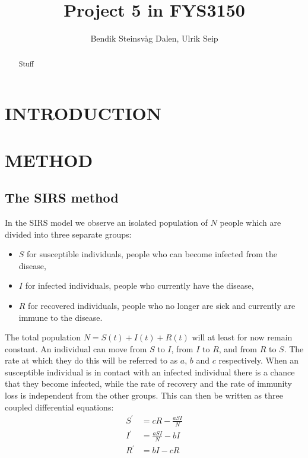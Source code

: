 \documentclass[a4paper]{article}
\title{Project 5 in FYS3150}
\author{Bendik Steinsvåg Dalen, Ulrik Seip}
\let\Oldsection\section
\renewcommand{\section}{\FloatBarrier\Oldsection}
\let\Oldsubsection\subsection
\renewcommand{\subsection}{\FloatBarrier\Oldsubsection}
\begin{document}
\maketitle


\begin{abstract}
	Stuff
\end{abstract}


\section{INTRODUCTION}


\section{METHOD}

\subsection{The SIRS method}

In the SIRS model we observe an isolated population of $N$ people which are divided into three separate groups:

\begin{itemize}
	\item $S$ for susceptible individuals, people who can become infected from the disease,
	\item $I$ for infected individuals, people who currently have the disease,
	\item $R$ for recovered individuals, people who no longer are sick and currently are immune to the disease.
\end{itemize}
The total population $N = S(t) + I(t) + R(t)$ will at least for now remain constant. An individual can move from $S$ to $I$, from $I$ to $R$, and from $R$ to $S$. The rate at which they do this will be referred to as $a$, $b$ and $c$ respectively. When an susceptible individual is in contact with an infected individual there is a chance that they become infected, while the rate of recovery and the rate of immunity loss is independent from the other groups. This can then be written as three coupled differential equations:
\begin{align}
S ^ { \prime } & = c R - \frac { a S I } { N } \\
I ^ { \prime } & = \frac { a S I } { N } - b I \\
R ^ { \prime } & = b I - c R \label{SIRS}
\end{align}
\end{document}
